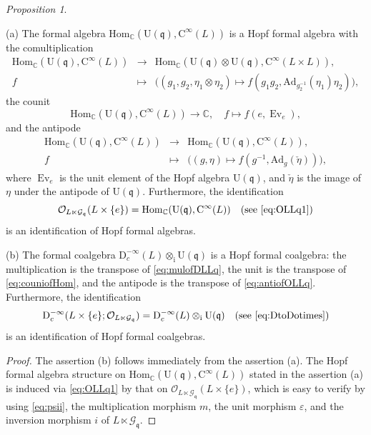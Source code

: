 \documentclass[12pt, a4paper]{amsart}
\newcommand{\BC}{{\mathbb {C}}}
\newcommand{\CG}{{\mathcal {G}}}
\newcommand{\CO}{{\mathcal {O}}}
\newcommand{\RC}{{\mathrm {C}}}
\newcommand{\RD}{{\mathrm {D}}}
\newcommand{\RU}{{\mathrm {U}}}
\newcommand{\Ad}{{\mathrm{Ad}}}
\newcommand{\Hom}{{\mathrm{Hom}}}
\newcommand{\Ev}{\operatorname{Ev}}
\newcommand{\q}{\mathfrak q}
\newcommand{\be}{\begin {equation}}
\newcommand{\ee}{\end {equation}}
\theoremstyle{Theorem}
\theoremstyle{Theorem}
\theoremstyle{Theorem}
\theoremstyle{Theorem}
\theoremstyle{Plain}
\theoremstyle{remark}
\theoremstyle{remark}
\theoremstyle{Definition}
\newtheorem{prpd}[dfn]{Proposition}
\numberwithin{equation}{section}
\begin{document}
\begin{prpd}\label{prop:OpfLLq}

\noindent (a)
The formal algebra $\Hom_{\BC}(\RU(\q),\RC^{\infty}(L))$ is a Hopf formal algebra with 
the comultiplication \begin{eqnarray}\label{eq:mulofDLLq}
    \Hom_{\BC}(\RU(\q),\RC^{\infty}(L))&\rightarrow &\Hom_{\BC}(\RU(\q)\otimes \RU(\q),\RC^{\infty}(L\times L)), \nonumber\\ f&\mapsto& \big((g_1,g_2,\eta_1\otimes\eta_2)\mapsto f(g_1g_2, \Ad_{g_2^{-1}}(\eta_1)\eta_2)\big),
\end{eqnarray}
the counit 
\be\label{eq:couniofHom} \Hom_{\BC}(\RU(\q),\RC^{\infty}(L))\rightarrow \BC,\quad f\mapsto f(e,\Ev_e),\ee
and the antipode  
\begin{eqnarray}\label{eq:antiofOLLq}
    \Hom_{\BC}(\RU(\q),\RC^{\infty}(L))&\rightarrow &\Hom_{\BC}(\RU(\q),\RC^{\infty}(L)), \nonumber\\ f&\mapsto& \big((g,\eta)\mapsto f(g^{-1}, \Ad_{g}(\check{\eta}))\big),
\end{eqnarray} 
where 
$\Ev_e$ is the unit element  of the Hopf algebra $\RU(\q)$, 
and $\check{\eta}$ is the image of $\eta$ under the antipode of $\RU(\q)$.
Furthermore, the identification \be\label{eq:OLLqtoHom} \CO_{L\ltimes \CG_{\q}}(L\times \{e\})=\Hom_{\BC}(\RU(\q),\RC^{\infty}(L))\quad \text{(see    \eqref{eq:OLLq1})}\ee  is an identification of Hopf formal algebras. 

\noindent (b) The formal coalgebra $\RD^{-\infty}_c(L)\otimes_{\mathrm{i}}\RU(\q)$ is a Hopf formal coalgebra: the multiplication is the transpose of \eqref{eq:mulofDLLq}, the unit is the transpose of \eqref{eq:couniofHom},  and the antipode is the transpose of \eqref{eq:antiofOLLq}.
Furthermore, the identification 
\be\label{eq:indenDtoDotimes} \RD^{-\infty}_c(L\times \{e\};\CO_{L\ltimes \CG_{\q}})=\RD^{-\infty}_c(L)\otimes_{\mathrm{i}}\RU(\q) \quad \text{(see \eqref{eq:DtoDotimes})}\ee  is an identification of Hopf formal coalgebras. 
\end{prpd}
\begin{proof} %
The assertion (b) follows immediately from the assertion (a). 
    The  Hopf formal algebra structure on $\Hom_{\BC}(\RU(\q),\RC^{\infty}(L))$ stated in the assertion (a) is induced via \eqref{eq:OLLq1} by that  on $\CO_{L\ltimes \CG_{\q}}(L\times \{e\})$, which is easy to verify by using \eqref{eq:psii},  
     the multiplication morphism $m$, the unit morphism $\varepsilon$, and the inversion morphism $i$ of $L\ltimes \CG_{\q}$. 
\end{proof}
\end{document}
